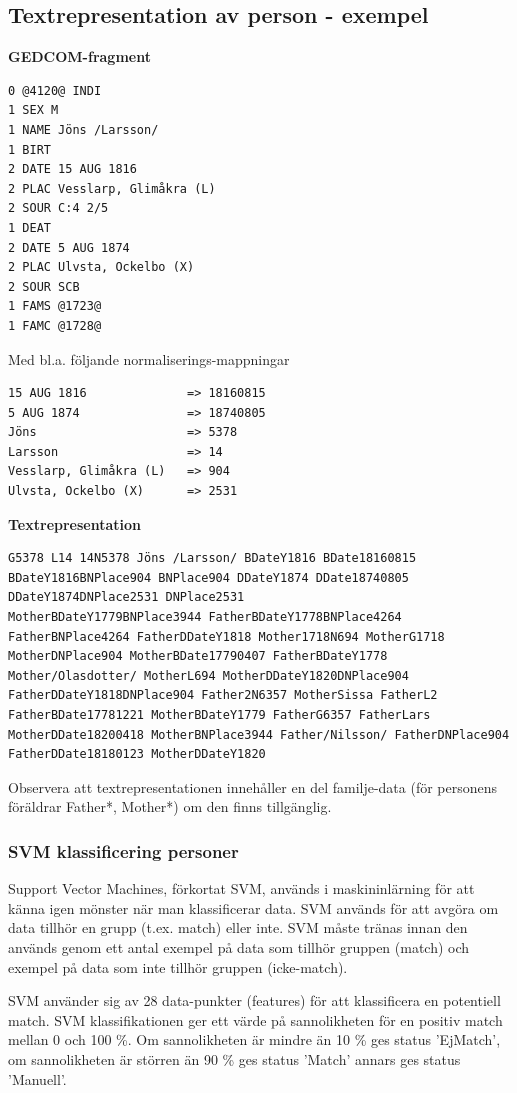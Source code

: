 \documentclass[swedish,11pt]{article}
\begin{document}
\subsection{Textrepresentation av person - exempel}\label{textrepr}

{\bf GEDCOM-fragment}
\begin{verbatim}
0 @4120@ INDI
1 SEX M
1 NAME Jöns /Larsson/
1 BIRT
2 DATE 15 AUG 1816
2 PLAC Vesslarp, Glimåkra (L)
2 SOUR C:4 2/5
1 DEAT
2 DATE 5 AUG 1874
2 PLAC Ulvsta, Ockelbo (X)
2 SOUR SCB
1 FAMS @1723@
1 FAMC @1728@
\end{verbatim}

Med bl.a. följande normaliserings-mappningar
\begin{verbatim}
15 AUG 1816              => 18160815
5 AUG 1874               => 18740805
Jöns                     => 5378
Larsson                  => 14
Vesslarp, Glimåkra (L)   => 904
Ulvsta, Ockelbo (X)      => 2531
\end{verbatim}

{\bf Textrepresentation}
\begin{verbatim}
G5378 L14 14N5378 Jöns /Larsson/ BDateY1816 BDate18160815
BDateY1816BNPlace904 BNPlace904 DDateY1874 DDate18740805
DDateY1874DNPlace2531 DNPlace2531
MotherBDateY1779BNPlace3944 FatherBDateY1778BNPlace4264
FatherBNPlace4264 FatherDDateY1818 Mother1718N694 MotherG1718
MotherDNPlace904 MotherBDate17790407 FatherBDateY1778
Mother/Olasdotter/ MotherL694 MotherDDateY1820DNPlace904
FatherDDateY1818DNPlace904 Father2N6357 MotherSissa FatherL2
FatherBDate17781221 MotherBDateY1779 FatherG6357 FatherLars
MotherDDate18200418 MotherBNPlace3944 Father/Nilsson/ FatherDNPlace904
FatherDDate18180123 MotherDDateY1820
\end{verbatim}
Observera att textrepresentationen innehåller en del familje-data (för
personens föräldrar Father*, Mother*) om den finns tillgänglig.

\subsubsection{SVM klassificering personer}\label{svm}
Support Vector Machines, förkortat SVM,
används i maskininlärning för att känna igen mönster när man klassificerar
data. SVM används för att avgöra om data tillhör en grupp
(t.ex. match) eller inte.
SVM måste tränas innan den används genom ett antal exempel på data som
tillhör gruppen (match) och exempel på data som inte tillhör gruppen (icke-match).

SVM använder sig av 28 data-punkter (features) för att klassificera en
potentiell match. SVM klassifikationen ger ett värde på sannolikheten
för en positiv match mellan 0 och 100 \%. Om sannolikheten är mindre
än 10 \% ges status 'EjMatch', om sannolikheten är störren än 90 \%
ges status 'Match' annars ges status 'Manuell'.
\end{document}

